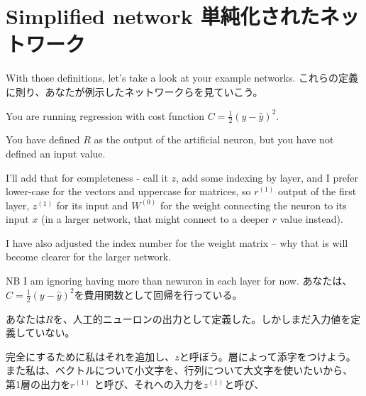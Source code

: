 \documentclass[uplatex,dvipdfmx]{jsarticle} \usepackage{amsmath,amssymb,bm}
\begin{document}
\section*{Simplified network 単純化されたネットワーク}
\begin{paracol}{2}
With those definitions, let's take a look at your example networks.
\switchcolumn
これらの定義に則り、あなたが例示したネットワークらを見ていこう。
\end{paracol}
\vspace{\baselineskip}
\begin{paracol}{2}
You are running regression with cost function $C=\frac12(y-\hat{y})^2$.

You have defined $R$ as the output of the artificial neuron, but you have not defined an input value.

I'll add that for completeness - call it $z$, add some indexing by layer, and I prefer lower-case for the vectors and uppercase for matrices, so $r^{(1)}$ output of the first layer, $z^{(1)}$ for its input and $W^{(0)}$ for the weight connecting the neuron to its input $x$ (in a larger network, that might connect to a deeper $r$ value instead).

I have also adjusted the index number for the weight matrix -- why that is will become clearer for the larger network.

NB I am ignoring having more than newuron in each layer for now.
\switchcolumn
あなたは、$C=\frac12(y-\hat{y})^2$を費用関数として回帰を行っている。

あなたは$R$を、人工的ニューロンの出力として定義した。しかしまだ入力値を定義していない。

完全にするために私はそれを追加し、$z$と呼ぼう。層によって添字をつけよう。また私は、ベクトルについて小文字を、行列について大文字を使いたいから、 第1層の出力を$r^{(1)}$ と呼び、それへの入力を$z^{(1)}$と呼び、
\end{paracol}




\vspace{\baselineskip}
\begin{paracol}{2}
\switchcolumn
\end{paracol}
\end{document}

